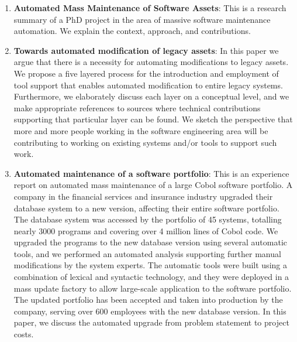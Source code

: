 \begin{englishtext}
\begin{enumerate}
    \item \textbf{Automated Mass Maintenance of Software Assets}: This is a research
    summary of a PhD project in the area of massive software maintenance
    automation. We explain the context, approach, and contributions.
    \cite{massMaintenance}

    \item \textbf{Towards automated modification of legacy assets}: In this paper we
    argue that there is a necessity for automating modifications to legacy
    assets. We propose a five layered process for the introduction and
    employment of tool support that enables automated modification to entire
    legacy systems. Furthermore, we elaborately discuss each layer on a
    conceptual level, and we make appropriate references to sources where
    technical contributions supporting that particular layer can be found. We
    sketch the perspective that more and more people working in the software
    engineering area will be contributing to working on existing systems and/or
    tools to support such work. \cite{legacyAssets}

    \item \textbf{Automated maintenance of a software portfolio}: This is an experience
    report on automated mass maintenance of a large Cobol software portfolio. A
    company in the financial services and insurance industry upgraded their
    database system to a new version, affecting their entire software portfolio.
    The database system was accessed by the portfolio of 45 systems, totalling
    nearly 3000 programs and covering over 4 million lines of Cobol code. We
    upgraded the programs to the new database version using several automatic
    tools, and we performed an automated analysis supporting further manual
    modifications by the system experts. The automatic tools were built using a
    combination of lexical and syntactic technology, and they were deployed in a
    mass update factory to allow large-scale application to the software
    portfolio. The updated portfolio has been accepted and taken into production
    by the company, serving over 600 employees with the new database version. In
    this paper, we discuss the automated upgrade from problem statement to
    project costs. \cite{softwarePortfolio}


\end{enumerate}
\end{englishtext}
